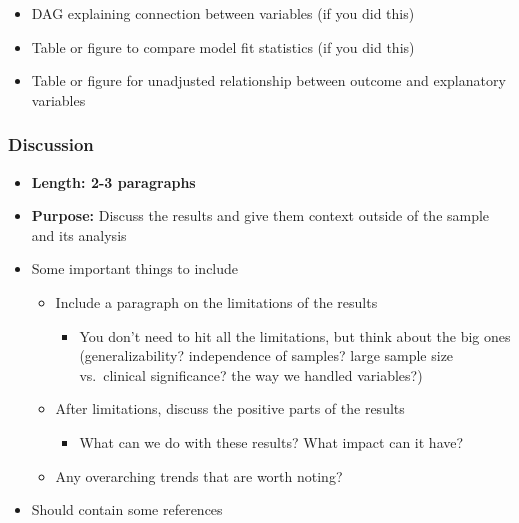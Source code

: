 \documentclass[
  letterpaper,
  DIV=11,
  numbers=noendperiod]{scrartcl}
\providecommand{\tightlist}{%
  \setlength{\itemsep}{0pt}\setlength{\parskip}{0pt}}\usepackage{longtable,booktabs,array}
\begin{document}
\begin{itemize}
\begin{itemize}
    \begin{itemize}
    \tightlist
    \item
      DAG explaining connection between variables (if you did this)
    \item
      Table or figure to compare model fit statistics (if you did this)
    \item
      Table or figure for unadjusted relationship between outcome and
      explanatory variables
    \end{itemize}
  \end{itemize}
\end{itemize}

\hypertarget{discussion}{%
\subsubsection{Discussion}\label{discussion}}

\begin{itemize}
\tightlist
\item
  \textbf{Length: 2-3 paragraphs}
\item
  \textbf{Purpose:} Discuss the results and give them context outside of
  the sample and its analysis
\item
  Some important things to include

  \begin{itemize}
  \tightlist
  \item
    Include a paragraph on the limitations of the results

    \begin{itemize}
    \tightlist
    \item
      You don't need to hit all the limitations, but think about the big
      ones (generalizability? independence of samples? large sample size
      vs.~clinical significance? the way we handled variables?)
    \end{itemize}
  \item
    After limitations, discuss the positive parts of the results

    \begin{itemize}
    \tightlist
    \item
      What can we do with these results? What impact can it have?
    \end{itemize}
  \item
    Any overarching trends that are worth noting?
  \end{itemize}
\item
  Should contain some references
\end{itemize}
\end{document}
